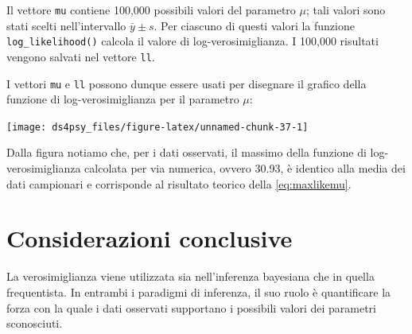 \documentclass[
  11pt,
]{krantz}
\makeatletter
\newenvironment{Shaded}{\begin{snugshade}}{\end{snugshade}}
\newcommand{\AttributeTok}[1]{\textcolor[rgb]{0.61,0.61,0.61}{#1}}
\newcommand{\FunctionTok}[1]{\textcolor[rgb]{0,0,0}{#1}}
\newcommand{\NormalTok}[1]{#1}
\newcommand{\SpecialCharTok}[1]{\textcolor[rgb]{0,0,0}{#1}}
\newcommand{\StringTok}[1]{\textcolor[rgb]{0.5,0.5,0.5}{#1}}
\newenvironment{kframe}{%
\medskip{}
\setlength{\fboxsep}{.8em}
 \def\at@end@of@kframe{}%
 \ifinner\ifhmode%
  \def\at@end@of@kframe{\end{minipage}}%
  \begin{minipage}{\columnwidth}%
 \fi\fi%
 \def\FrameCommand##1{\hskip\@totalleftmargin \hskip-\fboxsep
 \colorbox{shadecolor}{##1}\hskip-\fboxsep
     \hskip-\linewidth \hskip-\@totalleftmargin \hskip\columnwidth}%
 \MakeFramed {\advance\hsize-\width
   \@totalleftmargin\z@ \linewidth\hsize
   \@setminipage}}%
 {\par\unskip\endMakeFramed%
 \at@end@of@kframe}
\renewenvironment{Shaded}{\begin{kframe}}{\end{kframe}}
\theoremstyle{definition}
\theoremstyle{definition}
\theoremstyle{definition}
\theoremstyle{definition}
\theoremstyle{remark}
\makeatother
\begin{document}
Il vettore \texttt{mu} contiene 100,000 possibili valori del parametro \(\mu\); tali valori sono stati scelti nell'intervallo \(\bar{y} \pm s\). Per ciascuno di questi valori la funzione \texttt{log\_likelihood()} calcola il valore di log-verosimiglianza. I 100,000 risultati vengono salvati nel vettore \texttt{ll}.

I vettori \texttt{mu} e \texttt{ll} possono dunque essere usati per disegnare il grafico della funzione di log-verosimiglianza per il parametro \(\mu\):

\begin{Shaded}
\end{Shaded}

\begin{center}\texttt{[image: ds4psy\_files/figure-latex/unnamed-chunk-37-1]} \end{center}

Dalla figura notiamo che, per i dati osservati, il massimo della funzione di log-verosimiglianza calcolata per via numerica, ovvero 30.93, è identico alla media dei dati campionari e corrisponde al risultato teorico della \eqref{eq:maxlikemu}.

\hypertarget{considerazioni-conclusive-1}{%
\section*{Considerazioni conclusive}\label{considerazioni-conclusive-1}}


La verosimiglianza viene utilizzata sia nell'inferenza bayesiana che in quella frequentista. In entrambi i paradigmi di inferenza, il suo ruolo è quantificare la forza con la quale i dati osservati supportano i possibili valori dei parametri sconosciuti.
\end{document}
